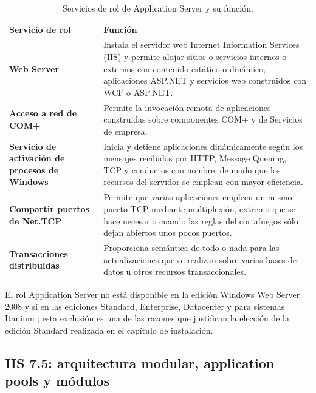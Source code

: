 \documentclass[12pt]{article}
\begin{document}
\begin{table}[H]
\centering
\small
\renewcommand{\arraystretch}{1.15}
\renewcommand{\tabularxcolumn}[1]{m{#1}}
\setlength{\emergencystretch}{1.5em}
\caption{Servicios de rol de Application Server y su función.}
\label{tab:serviciosRolApplicationServer}
\begin{tabularx}{\textwidth}{>{\centering\arraybackslash}m{4.4cm} X}
\toprule
\textbf{Servicio de rol} & \textbf{Función} \\
\midrule
\textbf{Web Server} & Instala el servidor web Internet Information Services (IIS) y permite alojar sitios o servicios internos o externos con contenido estático o dinámico, aplicaciones ASP.NET y servicios web construidos con WCF o ASP.NET. \\
\addlinespace
\textbf{Acceso a red de COM+} & Permite la invocación remota de aplicaciones construidas sobre componentes COM+ y de Servicios de empresa. \\
\addlinespace
\textbf{Servicio de activación de procesos de Windows} & Inicia y detiene aplicaciones dinámicamente según los mensajes recibidos por HTTP, Message Queuing, TCP y conductos con nombre, de modo que los recursos del servidor se emplean con mayor eficiencia. \\
\addlinespace
\textbf{Compartir puertos de Net.TCP} & Permite que varias aplicaciones empleen un mismo puerto TCP mediante multiplexión, extremo que se hace necesario cuando las reglas del cortafuegos sólo dejan abiertos unos pocos puertos. \\
\addlinespace
\textbf{Transacciones distribuidas} & Proporciona semántica de todo o nada para las actualizaciones que se realizan sobre varias bases de datos u otros recursos transaccionales. \\
\bottomrule
\end{tabularx}
\end{table}

El rol Application Server no está disponible en la edición Windows Web Server 2008 y sí en las ediciones Standard, Enterprise, Datacenter y para sistemas Itanium \parencite{microsoftApplicationServerRole}; esta exclusión es una de las razones que justifican la elección de la edición Standard realizada en el capítulo de instalación.

\subsection{IIS 7.5: arquitectura modular, application pools y módulos}
\label{sec:iis75Arquitectura}
\end{document}
